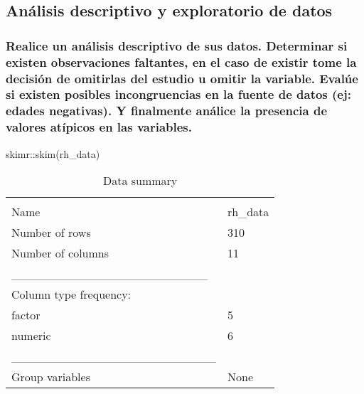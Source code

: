 \documentclass[
]{article}
\newenvironment{Shaded}{\begin{snugshade}}{\end{snugshade}}
\newcommand{\FunctionTok}[1]{\textcolor[rgb]{0.00,0.00,0.00}{#1}}
\newcommand{\NormalTok}[1]{#1}
\newcommand{\SpecialCharTok}[1]{\textcolor[rgb]{0.00,0.00,0.00}{#1}}
\begin{document}
\hypertarget{anuxe1lisis-descriptivo-y-exploratorio-de-datos}{%
\subsection{Análisis descriptivo y exploratorio de
datos}\label{anuxe1lisis-descriptivo-y-exploratorio-de-datos}}

\hypertarget{realice-un-anuxe1lisis-descriptivo-de-sus-datos.-determinar-si-existen-observaciones-faltantes-en-el-caso-de-existir-tome-la-decisiuxf3n-de-omitirlas-del-estudio-u-omitir-la-variable.-evaluxfae-si-existen-posibles-incongruencias-en-la-fuente-de-datos-ej-edades-negativas.-y-finalmente-anuxe1lice-la-presencia-de-valores-atuxedpicos-en-las-variables.}{%
\subsubsection{Realice un análisis descriptivo de sus datos. Determinar
si existen observaciones faltantes, en el caso de existir tome la
decisión de omitirlas del estudio u omitir la variable. Evalúe si
existen posibles incongruencias en la fuente de datos (ej: edades
negativas). Y finalmente análice la presencia de valores atípicos en las
variables.}\label{realice-un-anuxe1lisis-descriptivo-de-sus-datos.-determinar-si-existen-observaciones-faltantes-en-el-caso-de-existir-tome-la-decisiuxf3n-de-omitirlas-del-estudio-u-omitir-la-variable.-evaluxfae-si-existen-posibles-incongruencias-en-la-fuente-de-datos-ej-edades-negativas.-y-finalmente-anuxe1lice-la-presencia-de-valores-atuxedpicos-en-las-variables.}}

\begin{Shaded}
\begin{Highlighting}[]
\NormalTok{skimr}\SpecialCharTok{::}\FunctionTok{skim}\NormalTok{(rh\_data)}
\end{Highlighting}
\end{Shaded}

\begin{longtable}[]{@{}ll@{}}
\caption{Data summary}\tabularnewline
\toprule
& \\
\midrule
\endfirsthead
\toprule
& \\
\midrule
\endhead
Name & rh\_data \\
Number of rows & 310 \\
Number of columns & 11 \\
\_\_\_\_\_\_\_\_\_\_\_\_\_\_\_\_\_\_\_\_\_\_\_ & \\
Column type frequency: & \\
factor & 5 \\
numeric & 6 \\
\_\_\_\_\_\_\_\_\_\_\_\_\_\_\_\_\_\_\_\_\_\_\_\_ & \\
Group variables & None \\
\bottomrule
\end{longtable}
\end{document}
